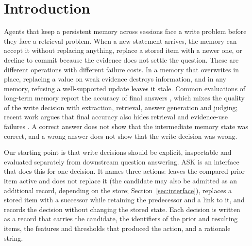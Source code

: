 \section{Introduction}
\label{sec:intro}
Agents that keep a persistent memory across sessions face a write problem before they face a retrieval problem. When a new statement arrives, the memory can accept it without replacing anything, replace a stored item with a newer one, or decline to commit because the evidence does not settle the question. These are different operations with different failure costs. In a memory that overwrites in place, replacing a value on weak evidence destroys information, and in any memory, refusing a well-supported update leaves it stale. Common evaluations of long-term memory report the accuracy of final answers \citep{arxiv_2410_10813}, which mixes the quality of the write decision with extraction, retrieval, answer generation and judging; recent work argues that final accuracy also hides retrieval and evidence-use failures \citep{arxiv_2606_17328}. A correct answer does not show that the intermediate memory state was correct, and a wrong answer does not show that the write decision was wrong.

Our starting point is that write decisions should be explicit, inspectable and evaluated separately from downstream question answering. ASK is an interface that does this for one decision. It names three actions: \keep{} leaves the compared prior item active and does not replace it (the candidate may also be admitted as an additional record, depending on the store; Section~\ref{sec:interface}), \supersede{} replaces a stored item with a successor while retaining the predecessor and a link to it, and \abstain{} records the decision without changing the stored state. Each decision is written as a record that carries the candidate, the identifiers of the prior and resulting items, the features and thresholds that produced the action, and a rationale string.

